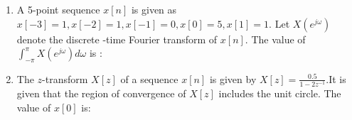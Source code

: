 \documentclass[journal,12pt,twocolumn]{IEEEtran}
\begin{document}
\begin{enumerate}
%
%
%

\item A 5-point sequence $x[n]$ is given as \newline $x[-3]=1,x[-2]=1,x[-1]=0,x[0]=5,x[1]=1.$  Let $X(e^{j\omega})$ denote the discrete -time Fourier transform of $x[n]$. The value of $\int_{-\pi}^{\pi}X(e^{j\omega})d\omega
$ is :\\
\begin{enumerate}[(A)]
\end{enumerate}

 
\item The $z$-transform $X[z]$ of a sequence $x[n]$ is given by $X[z]=\frac{0.5}{1-2z^{-1}}$.It is given that the region of convergence of $X[z]$ includes the unit circle. The value of $x[0]$ is:\\
\begin{enumerate}[(A)]
\end{enumerate}

%
%
%
%



\end{enumerate}
\end{document}
